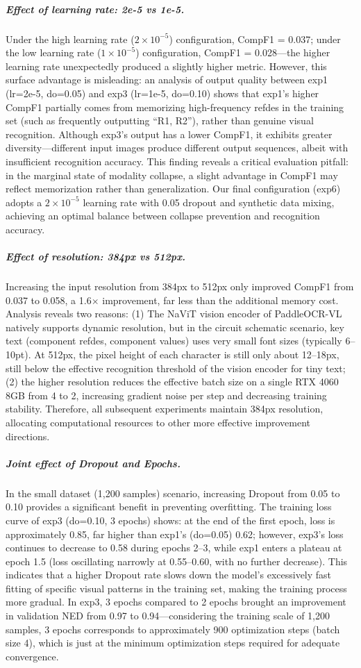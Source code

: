 \subparagraph{Effect of learning rate: 2e-5 vs 1e-5.}
Under the high learning rate ($2\times10^{-5}$) configuration, CompF1 = 0.037; under the low learning rate ($1\times10^{-5}$) configuration, CompF1 = 0.028---the higher learning rate unexpectedly produced a slightly higher metric. However, this surface advantage is misleading: an analysis of output quality between exp1 (lr=2e-5, do=0.05) and exp3 (lr=1e-5, do=0.10) shows that exp1's higher CompF1 partially comes from memorizing high-frequency refdes in the training set (such as frequently outputting ``R1, R2''), rather than genuine visual recognition. Although exp3's output has a lower CompF1, it exhibits greater diversity---different input images produce different output sequences, albeit with insufficient recognition accuracy. This finding reveals a critical evaluation pitfall: in the marginal state of modality collapse, a slight advantage in CompF1 may reflect memorization rather than generalization. Our final configuration (exp6) adopts a $2\times10^{-5}$ learning rate with 0.05 dropout and synthetic data mixing, achieving an optimal balance between collapse prevention and recognition accuracy.

\subparagraph{Effect of resolution: 384px vs 512px.}
Increasing the input resolution from 384px to 512px only improved CompF1 from 0.037 to 0.058, a 1.6$\times$ improvement, far less than the additional memory cost. Analysis reveals two reasons: (1) The NaViT vision encoder of PaddleOCR-VL natively supports dynamic resolution, but in the circuit schematic scenario, key text (component refdes, component values) uses very small font sizes (typically 6--10pt). At 512px, the pixel height of each character is still only about 12--18px, still below the effective recognition threshold of the vision encoder for tiny text; (2) the higher resolution reduces the effective batch size on a single RTX 4060 8GB from 4 to 2, increasing gradient noise per step and decreasing training stability. Therefore, all subsequent experiments maintain 384px resolution, allocating computational resources to other more effective improvement directions.

\subparagraph{Joint effect of Dropout and Epochs.}
In the small dataset (1,200 samples) scenario, increasing Dropout from 0.05 to 0.10 provides a significant benefit in preventing overfitting. The training loss curve of exp3 (do=0.10, 3 epochs) shows: at the end of the first epoch, loss is approximately 0.85, far higher than exp1's (do=0.05) 0.62; however, exp3's loss continues to decrease to 0.58 during epochs 2--3, while exp1 enters a plateau at epoch 1.5 (loss oscillating narrowly at 0.55--0.60, with no further decrease). This indicates that a higher Dropout rate slows down the model's excessively fast fitting of specific visual patterns in the training set, making the training process more gradual. In exp3, 3 epochs compared to 2 epochs brought an improvement in validation NED from 0.97 to 0.94---considering the training scale of 1,200 samples, 3 epochs corresponds to approximately 900 optimization steps (batch size 4), which is just at the minimum optimization steps required for adequate convergence.

